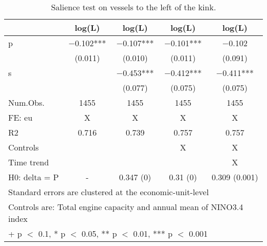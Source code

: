 \begin{table}

\caption{\label{tab:}Salience test on vessels to the left of the kink.}
\centering
\begin{tabular}[t]{lcccc}
\toprule
  & log(L) & log(L)  & log(L)   & log(L)   \\
\midrule
p & \num{-0.102}*** & \num{-0.107}*** & \num{-0.101}*** & \num{-0.102}\\
 & (\num{0.011}) & (\num{0.010}) & (\num{0.011}) & (\num{0.091})\\
s &  & \num{-0.453}*** & \num{-0.412}*** & \num{-0.411}***\\
 &  & (\num{0.077}) & (\num{0.075}) & (\num{0.075})\\
\midrule
Num.Obs. & \num{1455} & \num{1455} & \num{1455} & \num{1455}\\
FE: eu & X & X & X & X\\
R2 & 0.716 & 0.739 & 0.757 & 0.757\\
Controls &  &  & X & X\\
Time trend &  &  &  & X\\
H0: delta = P & - & 0.347 (0) & 0.31 (0) & 0.309 (0.001)\\
\bottomrule
\multicolumn{5}{l}{\rule{0pt}{1em}Standard errors are clustered at the economic-unit-level}\\
\multicolumn{5}{l}{\rule{0pt}{1em}Controls are: Total engine capacity and annual mean of NINO3.4 index}\\
\multicolumn{5}{l}{\rule{0pt}{1em}+ p $<$ 0.1, * p $<$ 0.05, ** p $<$ 0.01, *** p $<$ 0.001}\\
\end{tabular}
\end{table}
